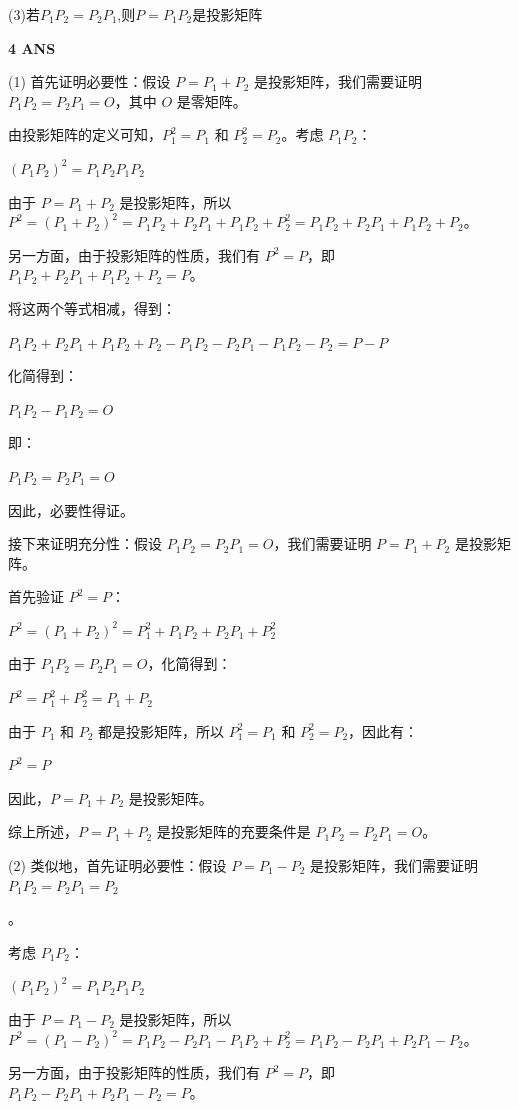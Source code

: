 \documentclass[11pt,letterpaper]{ctexart}
\begin{document}
\begin{enumerate}
(3)若$P_1P_2 = P_2P_1$,则$P = P_1P_2$是投影矩阵

\textbf{4 ANS}
\bigskip

(1) 首先证明必要性：假设 $P = P_1 + P_2$ 是投影矩阵，我们需要证明 $P_1P_2 = P_2P_1 = O$，其中 $O$ 是零矩阵。

由投影矩阵的定义可知，$P_1^2 = P_1$ 和 $P_2^2 = P_2$。考虑 $P_1P_2$：

$(P_1P_2)^2 = P_1P_2P_1P_2$

由于 $P = P_1 + P_2$ 是投影矩阵，所以 $P^2 = (P_1 + P_2)^2 = P_1P_2 + P_2P_1 + P_1P_2 + P_2^2 = P_1P_2 + P_2P_1 + P_1P_2 + P_2$。

另一方面，由于投影矩阵的性质，我们有 $P^2 = P$，即 $P_1P_2 + P_2P_1 + P_1P_2 + P_2 = P$。

将这两个等式相减，得到：

$P_1P_2 + P_2P_1 + P_1P_2 + P_2 - P_1P_2 - P_2P_1 - P_1P_2 - P_2 = P - P$

化简得到：

$P_1P_2 - P_1P_2 = O$

即：

$P_1P_2 = P_2P_1 = O$

因此，必要性得证。

接下来证明充分性：假设 $P_1P_2 = P_2P_1 = O$，我们需要证明 $P = P_1 + P_2$ 是投影矩阵。

首先验证 $P^2 = P$：

$P^2 = (P_1 + P_2)^2 = P_1^2 + P_1P_2 + P_2P_1 + P_2^2$

由于 $P_1P_2 = P_2P_1 = O$，化简得到：

$P^2 = P_1^2 + P_2^2 = P_1 + P_2$

由于 $P_1$ 和 $P_2$ 都是投影矩阵，所以 $P_1^2 = P_1$ 和 $P_2^2 = P_2$，因此有：

$P^2 = P$

因此，$P = P_1 + P_2$ 是投影矩阵。

综上所述，$P = P_1 + P_2$ 是投影矩阵的充要条件是 $P_1P_2 = P_2P_1 = O$。

(2) 类似地，首先证明必要性：假设 $P = P_1 - P_2$ 是投影矩阵，我们需要证明 $P_1P_2 = P_2P_1 = P_2$

。

考虑 $P_1P_2$：

$(P_1P_2)^2 = P_1P_2P_1P_2$

由于 $P = P_1 - P_2$ 是投影矩阵，所以 $P^2 = (P_1 - P_2)^2 = P_1P_2 - P_2P_1 - P_1P_2 + P_2^2 = P_1P_2 - P_2P_1 + P_2P_1 - P_2$。

另一方面，由于投影矩阵的性质，我们有 $P^2 = P$，即 $P_1P_2 - P_2P_1 + P_2P_1 - P_2 = P$。


\end{enumerate}
\end{document}
